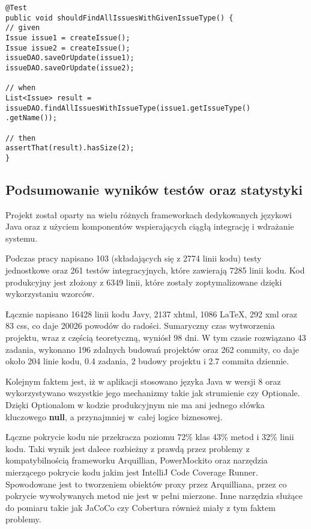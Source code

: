 \begin{lstlisting}[caption={Przykład testu integracyjnego}, label=lis:integ, numbers=none]
@Test
public void shouldFindAllIssuesWithGivenIssueType() {
// given
Issue issue1 = createIssue();
Issue issue2 = createIssue();
issueDAO.saveOrUpdate(issue1);
issueDAO.saveOrUpdate(issue2);

// when
List<Issue> result = issueDAO.findAllIssuesWithIssueType(issue1.getIssueType()
.getName());

// then
assertThat(result).hasSize(2);
}\end{lstlisting}


\subsection{Podsumowanie wyników testów oraz statystyki}
Projekt został oparty na wielu różnych frameworkach dedykowanych językowi Java oraz z użyciem komponentów wspierających ciągłą integrację i wdrażanie systemu.

Podczas pracy napisano 103 (składających się z 2774 linii kodu) testy jednostkowe oraz 261 testów integracyjnych, które zawierają 7285 linii kodu. Kod produkcyjny jest złożony z 6349 linii, które zostały zoptymalizowane dzięki wykorzystaniu wzorców. 

Łącznie napisano 16428 linii kodu Javy, 2137 xhtml, 1086 \LaTeX, 292 xml oraz 83 css, co daje 20026 powodów do radości.  Sumaryczny czas wytworzenia projektu, wraz z częścią teoretyczną, wyniósł 98 dni. W tym czasie rozwiązano 43 zadania, wykonano 196 zdalnych budowań projektów oraz 262 commity, co daje około 204 linie kodu, 0.4 zadania, 2 budowy projektu i 2.7 commita dziennie.

Kolejnym faktem jest, iż w aplikacji stosowano języka Java w wersji 8 oraz wykorzystywano wszystkie jego mechanizmy takie jak strumienie czy Optionale. Dzięki Optionalom w kodzie produkcyjnym nie ma ani jednego słówka kluczowego \textbf{null}, a przynajmniej w~całej logice biznesowej.

Łączne pokrycie kodu nie przekracza poziomu 72\% klas 43\% metod i 32\% linii kodu. Taki wynik jest dalece rozbieżny z prawdą przez problemy z kompatybilnością frameworku Arquillian, PowerMockito oraz narzędzia mierzącego pokrycie kodu jakim jest IntelliJ Code Coverage Runner. Spowodowane jest to tworzeniem obiektów proxy przez Arquilliana, przez co pokrycie wywoływanych metod nie jest w pełni mierzone. Inne narzędzia służące do pomiaru takie jak JaCoCo czy Cobertura również miały z tym faktem problemy.
